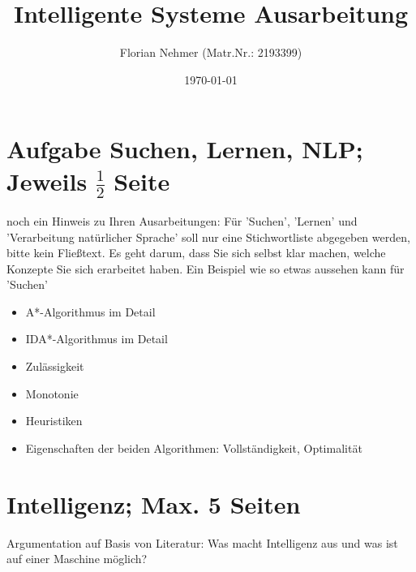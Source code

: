 \documentclass[a4paper, 11pt]{scrartcl}
\title{Intelligente Systeme Ausarbeitung}
\author{Florian Nehmer (Matr.Nr.: 2193399)}
\date{\today}
\begin{document}
\maketitle

\newpage
\tableofcontents

\newpage


\section{Aufgabe Suchen, Lernen, NLP; Jeweils $\frac{1}{2}$ Seite}
noch ein Hinweis zu Ihren Ausarbeitungen: Für 'Suchen', 'Lernen' und 'Verarbeitung natürlicher Sprache' soll nur eine Stichwortliste
abgegeben werden, bitte kein Fließtext. Es geht darum, dass Sie sich selbst klar machen, welche Konzepte Sie sich erarbeitet haben.
Ein Beispiel wie so etwas aussehen kann für 'Suchen'

\begin{itemize}
\item A*-Algorithmus im Detail
\item IDA*-Algorithmus im Detail
\item Zulässigkeit
\item Monotonie
\item Heuristiken
\item Eigenschaften der beiden Algorithmen: Vollständigkeit, Optimalität
\end{itemize}

\newpage

\section{Intelligenz; Max. 5 Seiten}
Argumentation auf Basis von Literatur: Was macht Intelligenz aus und was ist auf einer
Maschine möglich?
\end{document}
